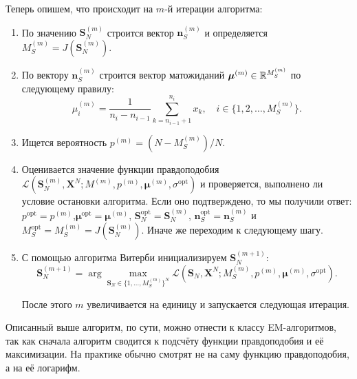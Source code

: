 Теперь опишем, что происходит на \(m\)-й итерации алгоритма:
\begin{enumerate}
	\item По значению \(\mathbf{S}_{N}^{(m)}\) строится вектор 
	\(\mathbf{n}_{S}^{(m)}\) и определяется \(M_{S}^{(m)} = 
	J(\mathbf{S}_{N}^{(m)})\).
	
	\item По вектору \(\mathbf{n}_{S}^{(m)}\) строится вектор матожиданий 
	\(\bm{\mu}^{(m)} \in \mathbb{R}^{M_{S}^{(m)}}\) по следующему правилу:
	\[
		\mu_{i}^{(m)} = \frac{1}{n_{i} - n_{i - 1}}\sum_{k = n_{i - 1} + 
		1}^{n_{i}} x_{k}, \quad i \in \{1, 2, \ldots, M_{S}^{(m)}\}.
	\]
	
	\item Ищется вероятность \(p^{(m)} = (N - M_{S}^{(m)})/N\).
	
	\item Оценивается значение функции правдоподобия 
	\(\mathcal{L}(\mathbf{S}_{N}^{(m)}, \mathbf{X}^{N}; M^{(m)}, p^{(m)}, 
	\bm{\mu}^{(m)}, \sigma^{\mathrm{opt}})\) и проверяется, выполнено ли 
	условие остановки алгоритма. Если оно подтверждено, то мы получили ответ: 
	\(p^{\mathrm{opt}} = p^{(m)}\),\(\bm{\mu}^{\mathrm{opt}} = 
	\bm{\mu}^{(m)}\), \(\mathbf{S}_{N}^{\mathrm{opt}} = \mathbf{S}_{N}^{(m)}\), 
	\(\mathbf{n}_{S}^{\mathrm{opt}} = \mathbf{n}_{S}^{(m)}\) и 
	\(M_{S}^{\mathrm{opt}} = M_{S}^{(m)} = J(\mathbf{S}_{N}^{(m)})\). Иначе же 
	переходим к следующему шагу.
	
	\item С помощью алгоритма Витерби инициализируем \(\mathbf{S}_{N}^{(m + 
	1)}\):
	\[
		\mathbf{S}_{N}^{(m + 1)} = \arg\max\limits_{\mathbf{S}_{N} \in \{1, 
		\ldots, M_{S}^{(m)}\}^{N}} \mathcal{L}(\mathbf{S}_{N}, \mathbf{X}^{N}; 
		M_{S}^{(m)}, p^{(m)}, \bm{\mu}^{(m)}, \sigma^{\mathrm{opt}}).
	\]
	
	 После этого \(m\) увеличивается на единицу и запускается следующая 
	 итерация.
\end{enumerate}

Описанный выше алгоритм, по сути, можно отнести к классу EM-алгоритмов, так как 
сначала алгоритм сводится к подсчёту функции правдоподобия и её максимизации. 
На практике обычно смотрят не на саму функцию правдоподобия, а на её логарифм.


